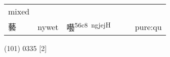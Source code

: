 \documentclass[14pt,a4paper]{scrartcl}
\begin{document}
\begin{longtable}[c]{@{}llllll@{}}
\begin{minipage}[t]{0.14\columnwidth}
mixed
\strut\end{minipage}\tabularnewline
\begin{minipage}[t]{0.14\columnwidth}\raggedright\strut
藝
\strut\end{minipage} &
\begin{minipage}[t]{0.14\columnwidth}\raggedright\strut
nywet
\strut\end{minipage} &
\begin{minipage}[t]{0.14\columnwidth}\raggedright\strut
囈\textsuperscript{56c8~ngjejH}
\strut\end{minipage} &
\begin{minipage}[t]{0.14\columnwidth}\raggedright\strut
\strut\end{minipage} &
\begin{minipage}[t]{0.14\columnwidth}\raggedright\strut
\strut\end{minipage} &
\begin{minipage}[t]{0.14\columnwidth}\raggedright\strut
pure:qu
\strut\end{minipage}\tabularnewline
\bottomrule
\end{longtable}

(101) 0335 {[}2{]}
\end{document}
